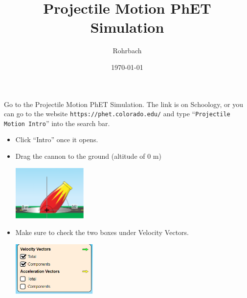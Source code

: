 \documentclass[10pt]{exam}
\title{Projectile Motion PhET Simulation}
\author{Rohrbach}
\date{\today}
\begin{document}
\maketitle


\noindent
Go to the Projectile Motion PhET Simulation.  The link is on Schoology, or you can go to the website \texttt{https://phet.colorado.edu/} and type ``\texttt{Projectile Motion Intro}'' into the search bar.

\begin{itemize}
  \item Click ``Intro'' once it opens.

  \item Drag the cannon to the ground (altitude of 0 m)
  
    \includegraphics{altitude.png}

  \item Make sure to check the two boxes under Velocity Vectors.
  
    \includegraphics{checkboxes.png}
    
\end{itemize}
\end{document}
